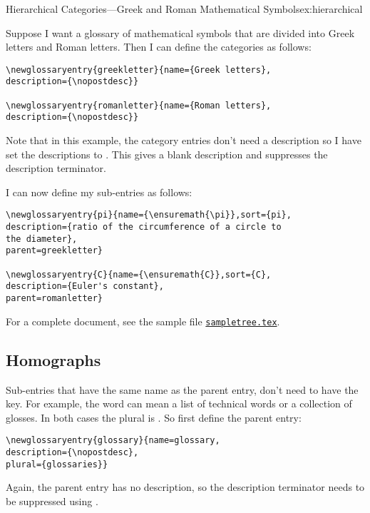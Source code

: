 \documentclass[report,inlinetitle]{nlctdoc}
\newcommand*{\gloskey}[2][newglossaryentry]{\csopt{#1}{#2}}
\newcounter{sample}
\newcommand*{\samplefile}[2][sample]{%
  \hyperref[ex:#1#2]{\texttt{#1#2.tex}}}
\begin{document}
\begin{example}{Hierarchical Categories---Greek and Roman 
Mathematical Symbols}{ex:hierarchical}

Suppose I want a glossary of mathematical symbols that
are divided into Greek letters and Roman letters. Then I can define
the categories as follows:
\begin{verbatim}
\newglossaryentry{greekletter}{name={Greek letters},
description={\nopostdesc}}

\newglossaryentry{romanletter}{name={Roman letters},
description={\nopostdesc}}
\end{verbatim}

Note that in this example, the category entries don't need a
description so I have set the descriptions to .
This gives a blank description and suppresses the
description terminator.

I can now define my sub-entries as follows:
\begin{verbatim}
\newglossaryentry{pi}{name={\ensuremath{\pi}},sort={pi},
description={ratio of the circumference of a circle to 
the diameter},
parent=greekletter}

\newglossaryentry{C}{name={\ensuremath{C}},sort={C},
description={Euler's constant},
parent=romanletter}
\end{verbatim}
For a complete document, see the sample file \samplefile{tree}.
\end{example}

\subsection{Homographs}
\label{sec:homographs}

Sub-entries that have the same name as the parent entry, don't need
to have the \gloskey{name} key. For example, the word 
can mean a list of technical words or a collection of glosses. In
both cases the plural is . So first define the parent
entry:
\begin{verbatim}
\newglossaryentry{glossary}{name=glossary,
description={\nopostdesc},
plural={glossaries}}
\end{verbatim}
Again, the parent entry has no description, so the description
terminator needs to be suppressed using .
\end{document}
